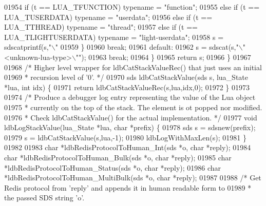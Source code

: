 \begin{DoxyCode}
{{{{{{{{{{{{{{{{01954         \textcolor{keywordflow}{if} (t == LUA\_TFUNCTION) \textcolor{keyword}{typename} = \textcolor{stringliteral}{"function"};
01955         \textcolor{keywordflow}{else} \textcolor{keywordflow}{if} (t == LUA\_TUSERDATA) \textcolor{keyword}{typename} = \textcolor{stringliteral}{"userdata"};
01956         \textcolor{keywordflow}{else} \textcolor{keywordflow}{if} (t == LUA\_TTHREAD) \textcolor{keyword}{typename} = \textcolor{stringliteral}{"thread"};
01957         \textcolor{keywordflow}{else} \textcolor{keywordflow}{if} (t == LUA\_TLIGHTUSERDATA) \textcolor{keyword}{typename} = \textcolor{stringliteral}{"light-userdata"};
01958         s = sdscatprintf(s,\textcolor{stringliteral}{"\(\backslash\)"%
01959         \}
01960         \textcolor{keywordflow}{break};
01961     \textcolor{keywordflow}{default}:
01962         s = sdscat(s,\textcolor{stringliteral}{"\(\backslash\)"<unknown-lua-type>\(\backslash\)""});
01963         \textcolor{keywordflow}{break};
01964     \}
01965     \textcolor{keywordflow}{return} s;
01966 \}
01967 
01968 \textcolor{comment}{/* Higher level wrapper for ldbCatStackValueRec() that just uses an initial}
01969 \textcolor{comment}{ * recursion level of '0'. */}
01970 sds ldbCatStackValue(sds s, lua\_State *lua, \textcolor{keywordtype}{int} idx) \{
01971     \textcolor{keywordflow}{return} ldbCatStackValueRec(s,lua,idx,0);
01972 \}
01973 
01974 \textcolor{comment}{/* Produce a debugger log entry representing the value of the Lua object}
01975 \textcolor{comment}{ * currently on the top of the stack. The element is ot popped nor modified.}
01976 \textcolor{comment}{ * Check ldbCatStackValue() for the actual implementation. */}
01977 \textcolor{keywordtype}{void} ldbLogStackValue(lua\_State *lua, \textcolor{keywordtype}{char} *prefix) \{
01978     sds s = sdsnew(prefix);
01979     s = ldbCatStackValue(s,lua,-1);
01980     ldbLogWithMaxLen(s);
01981 \}
01982 
01983 \textcolor{keywordtype}{char} *ldbRedisProtocolToHuman\_Int(sds *o, \textcolor{keywordtype}{char} *reply);
01984 \textcolor{keywordtype}{char} *ldbRedisProtocolToHuman\_Bulk(sds *o, \textcolor{keywordtype}{char} *reply);
01985 \textcolor{keywordtype}{char} *ldbRedisProtocolToHuman\_Status(sds *o, \textcolor{keywordtype}{char} *reply);
01986 \textcolor{keywordtype}{char} *ldbRedisProtocolToHuman\_MultiBulk(sds *o, \textcolor{keywordtype}{char} *reply);
01987 
01988 \textcolor{comment}{/* Get Redis protocol from 'reply' and appends it in human readable form to}
01989 \textcolor{comment}{ * the passed SDS string 'o'.}
}}}}}}}}}}}}}}}}}
\end{DoxyCode}
